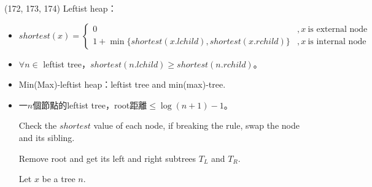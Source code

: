 \item \begin{theorem}{(172, 173, 174)} Leftist heap： \label{leftistheap}\begin{itemize}
        \item \begin{equation}
            shortest(x) = \begin{cases}
                0 &, x \ \text{is external node} \\
                1 + \min\{shortest(x.lchild), shortest(x.rchild)\} &, x \ \text{is internal node}
            \end{cases}
        \end{equation}
        \item $\forall n \in$ leftist tree，$shortest(n.lchild) \ge shortest(n.rchild)$。
        \item Min(Max)-leftist heap：leftist tree and min(max)-tree.
        \item 一$n$個節點的leftist tree，root距離$\le \log (n + 1) - 1$。
        \begin{algorithm}[H]
            \begin{algorithmic}[1]
                        \State {}
                    \Else 
                        \State {}
                    \EndIf
                    \State Check the $shortest$ value of each node, if breaking the rule, swap the node and its sibling.
                \EndFunction
            \end{algorithmic}
        \end{algorithm}
        \begin{algorithm}[H]
            \begin{algorithmic}[1]
                    \State Remove root and get its left and right subtrees $T_L$ and $T_R$.
                    \State {}
                \EndFunction
            \end{algorithmic}
        \end{algorithm}
        \begin{algorithm}[H]
            \begin{algorithmic}[1]
                    \State Let $x$ be a tree $n$.

\end{algorithmic}
\end{algorithm}
\end{itemize}
\end{theorem}
